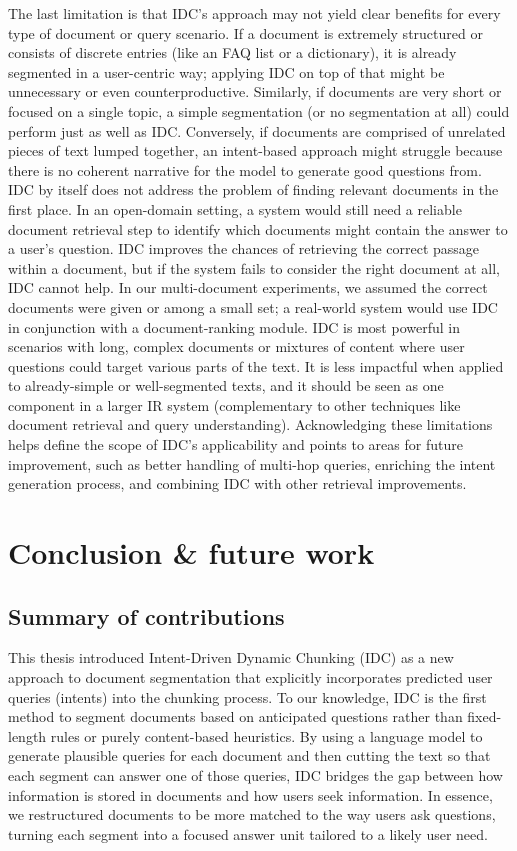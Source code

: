 \documentclass[12pt,a4paper]{report}
\begin{document}
The last limitation is that IDC's approach may not yield clear benefits for every type of document or query scenario. If a document is extremely structured or consists of discrete entries (like an FAQ list or a dictionary), it is already segmented in a user-centric way; applying IDC on top of that might be unnecessary or even counterproductive. Similarly, if documents are very short or focused on a single topic, a simple segmentation (or no segmentation at all) could perform just as well as IDC. Conversely, if documents are comprised of unrelated pieces of text lumped together, an intent-based approach might struggle because there is no coherent narrative for the model to generate good questions from. IDC by itself does not address the problem of finding relevant documents in the first place. In an open-domain setting, a system would still need a reliable document retrieval step to identify which documents might contain the answer to a user's question. IDC improves the chances of retrieving the correct passage within a document, but if the system fails to consider the right document at all, IDC cannot help. In our multi-document experiments, we assumed the correct documents were given or among a small set; a real-world system would use IDC in conjunction with a document-ranking module. IDC is most powerful in scenarios with long, complex documents or mixtures of content where user questions could target various parts of the text. It is less impactful when applied to already-simple or well-segmented texts, and it should be seen as one component in a larger IR system (complementary to other techniques like document retrieval and query understanding). Acknowledging these limitations helps define the scope of IDC's applicability and points to areas for future improvement, such as better handling of multi-hop queries, enriching the intent generation process, and combining IDC with other retrieval improvements.

\chapter{Conclusion \& future work}
\section{Summary of contributions}

This thesis introduced Intent-Driven Dynamic Chunking (IDC) as a new approach to document segmentation that explicitly incorporates predicted user queries (intents) into the chunking process. To our knowledge, IDC is the first method to segment documents based on anticipated questions rather than fixed-length rules or purely content-based heuristics. By using a language model to generate plausible queries for each document and then cutting the text so that each segment can answer one of those queries, IDC bridges the gap between how information is stored in documents and how users seek information. In essence, we restructured documents to be more matched to the way users ask questions, turning each segment into a focused answer unit tailored to a likely user need.
\end{document}
